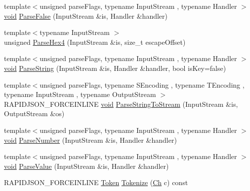\begin{DoxyCompactItemize}
\item 
{\footnotesize template$<$unsigned parse\+Flags, typename Input\+Stream , typename Handler $>$ }\\\hyperlink{imgui__impl__opengl3__loader_8h_ac668e7cffd9e2e9cfee428b9b2f34fa7}{void} \hyperlink{classGenericReader_af3af2d4e8efa1b8ef2f0bb281d8f0540}{Parse\+False} (Input\+Stream \&is, Handler \&handler)
\item 
{\footnotesize template$<$typename Input\+Stream $>$ }\\unsigned \hyperlink{classGenericReader_afc44000d3b4d538080b09c6a43c00f20}{Parse\+Hex4} (Input\+Stream \&is, size\+\_\+t escape\+Offset)
\item 
{\footnotesize template$<$unsigned parse\+Flags, typename Input\+Stream , typename Handler $>$ }\\\hyperlink{imgui__impl__opengl3__loader_8h_ac668e7cffd9e2e9cfee428b9b2f34fa7}{void} \hyperlink{classGenericReader_ab4d4f63b23b55a72069e2e13eb010cff}{Parse\+String} (Input\+Stream \&is, Handler \&handler, bool is\+Key=false)
\item 
{\footnotesize template$<$unsigned parse\+Flags, typename S\+Encoding , typename T\+Encoding , typename Input\+Stream , typename Output\+Stream $>$ }\\R\+A\+P\+I\+D\+J\+S\+O\+N\+\_\+\+F\+O\+R\+C\+E\+I\+N\+L\+I\+NE \hyperlink{imgui__impl__opengl3__loader_8h_ac668e7cffd9e2e9cfee428b9b2f34fa7}{void} \hyperlink{classGenericReader_a8fa22aded7085b3fe5f9d59467318f8a}{Parse\+String\+To\+Stream} (Input\+Stream \&is, Output\+Stream \&os)
\item 
{\footnotesize template$<$unsigned parse\+Flags, typename Input\+Stream , typename Handler $>$ }\\\hyperlink{imgui__impl__opengl3__loader_8h_ac668e7cffd9e2e9cfee428b9b2f34fa7}{void} \hyperlink{classGenericReader_a2447207fde31185e2bb8fbf1250b72e0}{Parse\+Number} (Input\+Stream \&is, Handler \&handler)
\item 
{\footnotesize template$<$unsigned parse\+Flags, typename Input\+Stream , typename Handler $>$ }\\\hyperlink{imgui__impl__opengl3__loader_8h_ac668e7cffd9e2e9cfee428b9b2f34fa7}{void} \hyperlink{classGenericReader_a8c0d07512c0fa447f45c9e5b00dd2d70}{Parse\+Value} (Input\+Stream \&is, Handler \&handler)
\item 
R\+A\+P\+I\+D\+J\+S\+O\+N\+\_\+\+F\+O\+R\+C\+E\+I\+N\+L\+I\+NE \hyperlink{classGenericReader_a78cbc3012843daeaa44cb3c2b779a8a8}{Token} \hyperlink{classGenericReader_a0871b9653ca8283d92ac753bf63e33ce}{Tokenize} (\hyperlink{classGenericReader_ab39a92bb26d50aee6469df604622218a}{Ch} c) const

\end{DoxyCompactItemize}
